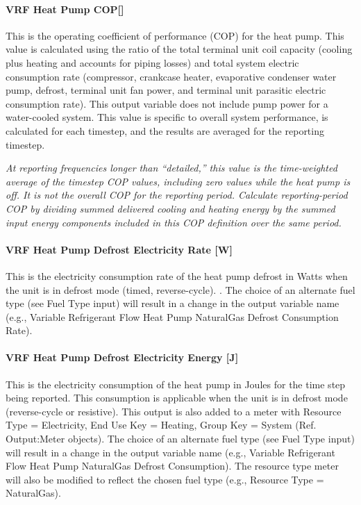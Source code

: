 \paragraph{\texorpdfstring{VRF Heat Pump COP{[]}}{VRF Heat Pump COP}}\label{vrf-heat-pump-cop}

This is the operating coefficient of performance (COP) for the heat pump. This value is calculated using the ratio of the total terminal unit coil capacity (cooling plus heating and accounts for piping losses) and total system electric consumption rate (compressor, crankcase heater, evaporative condenser water pump, defrost, terminal unit fan power, and terminal unit parasitic electric consumption rate). This output variable does not include pump power for a water-cooled system. This value is specific to overall system performance, is calculated for each timestep, and the results are averaged for the reporting timestep.

\emph{At reporting frequencies longer than ``detailed,'' this value is the time-weighted average of the timestep COP values, including zero values while the heat pump is off. It is not the overall COP for the reporting period. Calculate reporting-period COP by dividing summed delivered cooling and heating energy by the summed input energy components included in this COP definition over the same period.}

\paragraph{VRF Heat Pump Defrost Electricity Rate {[}W{]}}\label{vrf-heat-pump-defrost-electric-power-w}

This is the electricity consumption rate of the heat pump defrost in Watts when the unit is in defrost mode (timed, reverse-cycle). . The choice of an alternate fuel type (see Fuel Type input) will result in a change in the output variable name (e.g., Variable Refrigerant Flow Heat Pump NaturalGas Defrost Consumption Rate).

\paragraph{VRF Heat Pump Defrost Electricity Energy {[}J{]}}\label{vrf-heat-pump-defrost-electric-energy-j}

This is the electricity consumption of the heat pump in Joules for the time step being reported. This consumption is applicable when the unit is in defrost mode (reverse-cycle or resistive). This output is also added to a meter with Resource Type = Electricity, End Use Key = Heating, Group Key = System (Ref. Output:Meter objects). The choice of an alternate fuel type (see Fuel Type input) will result in a change in the output variable name (e.g., Variable Refrigerant Flow Heat Pump NaturalGas Defrost Consumption). The resource type meter will also be modified to reflect the chosen fuel type (e.g., Resource Type = NaturalGas).

